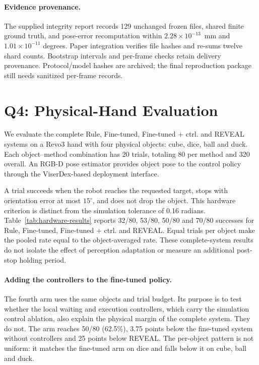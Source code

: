 \paragraph{Evidence provenance.}
The supplied integrity report records 129 unchanged frozen files, shared finite ground truth, and pose-error recomputation within $2.28\times10^{-13}$~mm and $1.01\times10^{-11}$ degrees. Paper integration verifies file hashes and re-sums twelve shard counts. Bootstrap intervals and per-frame checks retain delivery provenance. Protocol/model hashes are archived; the final reproduction package still needs sanitized per-frame records.

\section{Q4: Physical-Hand Evaluation}
\label{sec:hardware}
We evaluate the complete Rule, Fine-tuned, Fine-tuned + ctrl. and REVEAL systems on a Revo3 hand with four physical objects: cube, dice, ball and duck. Each object--method combination has 20 trials, totaling 80 per method and 320 overall. An RGB-D pose estimator provides object pose to the control policy through the ViserDex-based deployment interface.



A trial succeeds when the robot reaches the requested target, stops with orientation error at most $15^\circ$, and does not drop the object. This hardware criterion is distinct from the simulation tolerance of 0.16 radians. Table~\ref{tab:hardware-results} reports 32/80, 53/80, 50/80 and 70/80 successes for Rule, Fine-tuned, Fine-tuned + ctrl. and REVEAL. Equal trials per object make the pooled rate equal to the object-averaged rate. These complete-system results do not isolate the effect of perception adaptation or measure an additional post-stop holding period.

\paragraph{Adding the controllers to the fine-tuned policy.}
The fourth arm uses the same objects and trial budget. Its purpose is to test whether the local waiting and execution controllers, which carry the simulation control ablation, also explain the physical margin of the complete system. They do not. The arm reaches 50/80 (62.5\%), 3.75 points below the fine-tuned system without controllers and 25 points below REVEAL. The per-object pattern is not uniform: it matches the fine-tuned arm on dice and falls below it on cube, ball and duck.

